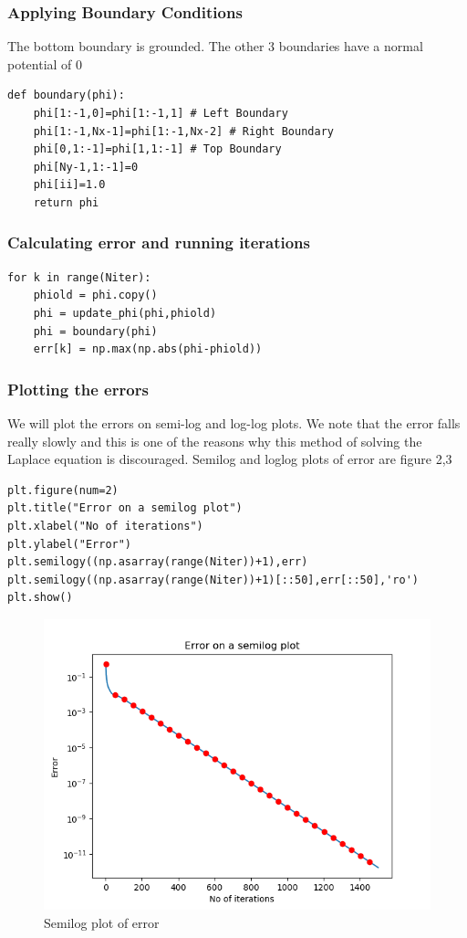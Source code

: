 \documentclass{article}
\begin{document}
\subsubsection*{Applying Boundary Conditions}
The bottom boundary is grounded. The other 3 boundaries have a normal potential of 0
\begin{lstlisting}
def boundary(phi):
    phi[1:-1,0]=phi[1:-1,1] # Left Boundary
    phi[1:-1,Nx-1]=phi[1:-1,Nx-2] # Right Boundary
    phi[0,1:-1]=phi[1,1:-1] # Top Boundary
    phi[Ny-1,1:-1]=0
    phi[ii]=1.0
    return phi
\end{lstlisting}
\subsubsection*{Calculating error and running iterations}
\begin{lstlisting}
for k in range(Niter):
    phiold = phi.copy()
    phi = update_phi(phi,phiold)
    phi = boundary(phi)
    err[k] = np.max(np.abs(phi-phiold))
\end{lstlisting}

\subsubsection*{Plotting the errors}
We will plot the errors on semi-log and log-log plots. We note that the error falls really slowly and this is one of the reasons why this method of solving the Laplace equation is discouraged. Semilog and loglog plots of error are figure 2,3

\begin{lstlisting}
plt.figure(num=2)
plt.title("Error on a semilog plot")
plt.xlabel("No of iterations")
plt.ylabel("Error")
plt.semilogy((np.asarray(range(Niter))+1),err)
plt.semilogy((np.asarray(range(Niter))+1)[::50],err[::50],'ro')
plt.show()

\end{lstlisting}

\begin{figure}[h!]
\centering
\includegraphics[scale=0.6]{Figure_2_5.png}
\caption{Semilog plot of error}
\label{Semilog plot of error}
\end{figure}
\end{document}

